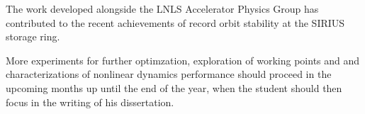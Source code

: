 The work developed alongside the LNLS Accelerator Physics Group has contributed to the recent achievements of record orbit stability at the SIRIUS storage ring.

More experiments for further optimzation, exploration of working points and and characterizations of nonlinear dynamics performance should proceed in the upcoming months up until the end of the year, when the student should then focus in the writing of his dissertation.\
